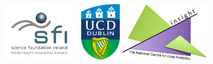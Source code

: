 \documentclass[british,a4paper,12pt]{phdthesis}
\begin{document}

\onehalfspacing


%

%


\singlespacing



\newpage

\phantom{a}
 
\begin{figure}[b]
  \centering
	\includegraphics[height=3cm]{graphics/logos/SFI.png} %
	\hfill
	\includegraphics[height=3cm]{graphics/logos/ucd_brandmark_colour.jpg}%
	\hfill
	\includegraphics[height=3cm]{graphics/logos/insight_logo.png}%
\end{figure}
\end{document}
